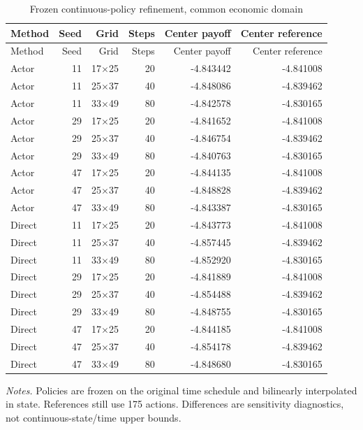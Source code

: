 \begin{small}
\begin{longtable}{lrrrrr}
\caption{Frozen continuous-policy refinement, common economic domain}\\
\toprule
Method & Seed & Grid & Steps & Center payoff & Center reference \\
\midrule\endfirsthead
\toprule
Method & Seed & Grid & Steps & Center payoff & Center reference \\
\midrule\endhead
Actor & 11 & 17$\times$25 & 20 & -4.843442 & -4.841008 \\
Actor & 11 & 25$\times$37 & 40 & -4.848086 & -4.839462 \\
Actor & 11 & 33$\times$49 & 80 & -4.842578 & -4.830165 \\
Actor & 29 & 17$\times$25 & 20 & -4.841652 & -4.841008 \\
Actor & 29 & 25$\times$37 & 40 & -4.846754 & -4.839462 \\
Actor & 29 & 33$\times$49 & 80 & -4.840763 & -4.830165 \\
Actor & 47 & 17$\times$25 & 20 & -4.844135 & -4.841008 \\
Actor & 47 & 25$\times$37 & 40 & -4.848828 & -4.839462 \\
Actor & 47 & 33$\times$49 & 80 & -4.843387 & -4.830165 \\
Direct & 11 & 17$\times$25 & 20 & -4.843773 & -4.841008 \\
Direct & 11 & 25$\times$37 & 40 & -4.857445 & -4.839462 \\
Direct & 11 & 33$\times$49 & 80 & -4.852920 & -4.830165 \\
Direct & 29 & 17$\times$25 & 20 & -4.841889 & -4.841008 \\
Direct & 29 & 25$\times$37 & 40 & -4.854488 & -4.839462 \\
Direct & 29 & 33$\times$49 & 80 & -4.848755 & -4.830165 \\
Direct & 47 & 17$\times$25 & 20 & -4.844185 & -4.841008 \\
Direct & 47 & 25$\times$37 & 40 & -4.854178 & -4.839462 \\
Direct & 47 & 33$\times$49 & 80 & -4.848680 & -4.830165 \\
\bottomrule\end{longtable}\end{small}
\noindent\textit{Notes.} Policies are frozen on the original time schedule and bilinearly interpolated in state. References still use 175 actions. Differences are sensitivity diagnostics, not continuous-state/time upper bounds.
